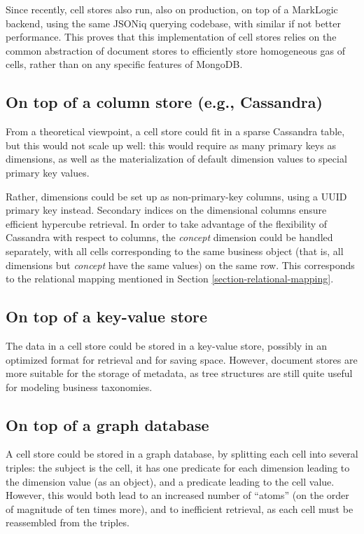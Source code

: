 \documentclass{acm_proc_article-sp}
\begin{document}
Since recently, cell stores also run, also on production, on top of a MarkLogic backend, using the same JSONiq querying codebase, with similar if not better performance. This proves that this implementation of cell stores relies on the common abstraction of document stores to efficiently store homogeneous gas of cells, rather than on any specific features of MongoDB.

\subsection{On top of a column store (e.g., Cassandra)}

From a theoretical viewpoint, a cell store could fit in a sparse Cassandra table, but this would not scale up well: this would require as many primary keys as dimensions, as well as the materialization of default dimension values to special primary key values.

Rather, dimensions could be set up as non-primary-key columns, using a UUID primary key instead. Secondary indices on the dimensional columns ensure efficient hypercube retrieval. In order to take advantage of the flexibility of Cassandra with respect to columns, the \emph{concept} dimension could be handled separately, with all cells corresponding to the same business object (that is, all dimensions but \emph{concept} have the same values) on the same row. This corresponds to the relational mapping mentioned in Section \ref{section-relational-mapping}.

\subsection{On top of a key-value store}

The data in a cell store could be stored in a key-value store, possibly in an optimized format for retrieval and for saving space. However, document stores are more suitable for the storage of metadata, as tree structures are still quite useful for modeling business taxonomies.

\subsection{On top of a graph database}

A cell store could be stored in a graph database, by splitting each cell into several triples: the subject is the cell, it has one predicate for each dimension leading to the dimension value (as an object), and a predicate leading to the cell value. However, this would both lead to an increased number of ``atoms'' (on the order of magnitude of ten times more), and to inefficient retrieval, as each cell must be reassembled from the triples.
\end{document}
